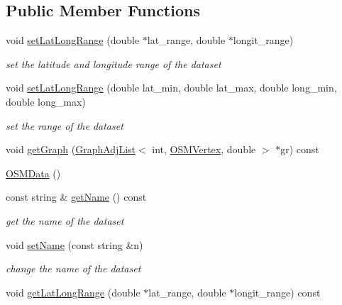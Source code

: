 \subsection*{Public Member Functions}
\begin{DoxyCompactItemize}
\item 
void \mbox{\hyperlink{classbridges_1_1dataset_1_1_o_s_m_data_abb602dbb1e86cc8c37bdc6376a2d1463}{set\+Lat\+Long\+Range}} (double $\ast$lat\+\_\+range, double $\ast$longit\+\_\+range)
\begin{DoxyCompactList}\small\item\em set the latitude and longitude range of the dataset \end{DoxyCompactList}\item 
void \mbox{\hyperlink{classbridges_1_1dataset_1_1_o_s_m_data_aba8bf3a70d17423d335773f025eaafa8}{set\+Lat\+Long\+Range}} (double lat\+\_\+min, double lat\+\_\+max, double long\+\_\+min, double long\+\_\+max)
\begin{DoxyCompactList}\small\item\em set the range of the dataset \end{DoxyCompactList}\item 
void \mbox{\hyperlink{classbridges_1_1dataset_1_1_o_s_m_data_a4393ea434040850f1f9ffede837313e7}{get\+Graph}} (\mbox{\hyperlink{classbridges_1_1datastructure_1_1_graph_adj_list}{Graph\+Adj\+List}}$<$ int, \mbox{\hyperlink{classbridges_1_1dataset_1_1_o_s_m_vertex}{O\+S\+M\+Vertex}}, double $>$ $\ast$gr) const
\item 
\mbox{\hyperlink{classbridges_1_1dataset_1_1_o_s_m_data_a53a8b50f2726dd90e7e0f78690abf121}{O\+S\+M\+Data}} ()
\item 
const string \& \mbox{\hyperlink{classbridges_1_1dataset_1_1_o_s_m_data_a434fa34e00e644ad04ca305d10a2c8e0}{get\+Name}} () const
\begin{DoxyCompactList}\small\item\em get the name of the dataset \end{DoxyCompactList}\item 
void \mbox{\hyperlink{classbridges_1_1dataset_1_1_o_s_m_data_aba68aa38305990876b4dbe5c92764ffd}{set\+Name}} (const string \&n)
\begin{DoxyCompactList}\small\item\em change the name of the dataset \end{DoxyCompactList}\item 
void \mbox{\hyperlink{classbridges_1_1dataset_1_1_o_s_m_data_ad63fda9eca521ce48e99753229ada4d1}{get\+Lat\+Long\+Range}} (double $\ast$lat\+\_\+range, double $\ast$longit\+\_\+range) const

\end{DoxyCompactItemize}
